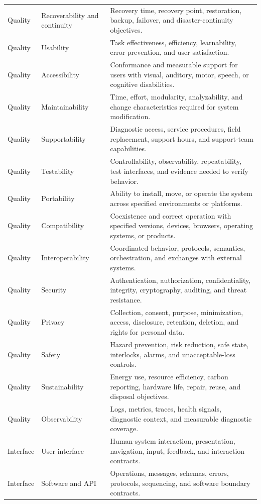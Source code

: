 \begin{tabularx}{\linewidth}{L{3.0cm}L{4.0cm}Y}
Quality & Recoverability and continuity & Recovery time, recovery point, restoration, backup, failover, and disaster-continuity objectives.\\
Quality & Usability & Task effectiveness, efficiency, learnability, error prevention, and user satisfaction.\\
Quality & Accessibility & Conformance and measurable support for users with visual, auditory, motor, speech, or cognitive disabilities.\\
Quality & Maintainability & Time, effort, modularity, analyzability, and change characteristics required for system modification.\\
Quality & Supportability & Diagnostic access, service procedures, field replacement, support hours, and support-team capabilities.\\
Quality & Testability & Controllability, observability, repeatability, test interfaces, and evidence needed to verify behavior.\\
Quality & Portability & Ability to install, move, or operate the system across specified environments or platforms.\\
Quality & Compatibility & Coexistence and correct operation with specified versions, devices, browsers, operating systems, or products.\\
Quality & Interoperability & Coordinated behavior, protocols, semantics, orchestration, and exchanges with external systems.\\
Quality & Security & Authentication, authorization, confidentiality, integrity, cryptography, auditing, and threat resistance.\\
Quality & Privacy & Collection, consent, purpose, minimization, access, disclosure, retention, deletion, and rights for personal data.\\
Quality & Safety & Hazard prevention, risk reduction, safe state, interlocks, alarms, and unacceptable-loss controls.\\
Quality & Sustainability & Energy use, resource efficiency, carbon reporting, hardware life, repair, reuse, and disposal objectives.\\
Quality & Observability & Logs, metrics, traces, health signals, diagnostic context, and measurable diagnostic coverage.\\
Interface & User interface & Human-system interaction, presentation, navigation, input, feedback, and interaction contracts.\\
Interface & Software and API & Operations, messages, schemas, errors, protocols, sequencing, and software boundary contracts.\\

\end{tabularx}
